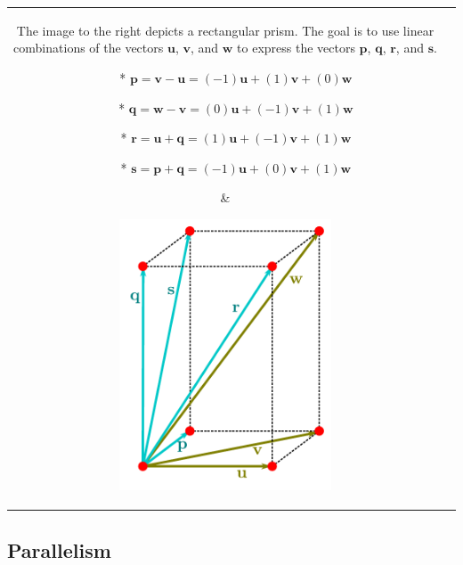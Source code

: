 \documentclass{article}
\begin{document}
\begin{center}
\begin{tabular}{cc}
\parbox{0.5\textwidth}{
The image to the right depicts a rectangular prism. The goal is to use linear combinations of the vectors \(\mathbf{u}\), \(\mathbf{v}\), and \(\mathbf{w}\) to express the vectors \(\mathbf{p}\), \(\mathbf{q}\), \(\mathbf{r}\), and \(\mathbf{s}\). 
\begin{itemize}
\item[*] \(\mathbf{p} = \mathbf{v} - \mathbf{u} = (-1)\mathbf{u} + (1)\mathbf{v} + (0)\mathbf{w}\)
\item[*] \(\mathbf{q} = \mathbf{w} - \mathbf{v} = (0)\mathbf{u} + (-1)\mathbf{v} + (1)\mathbf{w}\)
\item[*] \(\mathbf{r} = \mathbf{u} + \mathbf{q} = (1)\mathbf{u} + (-1)\mathbf{v} + (1)\mathbf{w}\)
\item[*] \(\mathbf{s} = \mathbf{p} + \mathbf{q} = (-1)\mathbf{u} + (0)\mathbf{v} + (1)\mathbf{w}\)
\end{itemize}
} & \parbox{0.5\textwidth}{
\includegraphics[width = 0.5\textwidth]{displacement_vector_lin_comb_example}
}
\end{tabular}
\end{center}



\subsection*{Parallelism}
\end{document}
